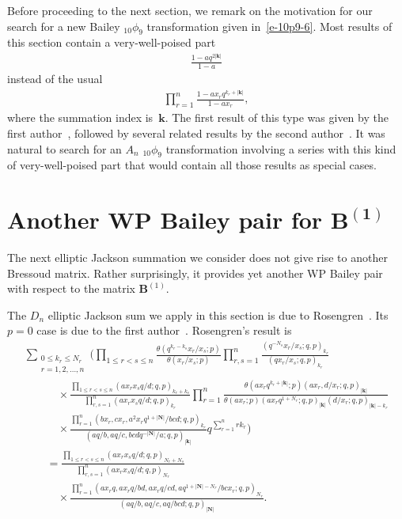 \documentclass[pdftex]{sigma}
\numberwithin{equation}{section}
\newcommand{\sumN}{{\left| \boldsymbol{N} \right|}}
\newcommand\sumk{{\left| \boldsymbol{k} \right|}}
\newcommand{\B}{{ \mathbf B}}
\renewcommand{\k}{{ \boldsymbol{k}}}
\newcommand{\multsum}[3]{{\sum\limits_{\substack{{0\le #1_#3 \le #2_#3} \\
{#3 =1,2,\dots, n}}}}}
\newcommand{\triprod}[1]{\prod\limits_{1\le r < s \le #1}}
\newcommand{\sqprod}[1]{\prod\limits_{r, s =1}^{#1}} %
\newcommand{\smallprod}[1]{\prod\limits_{r =1}^{#1}} %
\newcommand{\xover}[1]{#1_{r}/#1_{s}}
\newcommand{\ellipticqrfac}[2]{{\left({#1}; q, p\right)_{#2}}} %
\newcommand{\elliptictheta}[1]{\theta \left({#1} ; p\right) }
\newcommand{\ellipticvandermonde}[3]{\triprod{#3} %
\!\! \frac{\elliptictheta{q^{#2_r-#2_s} \xover {#1} }}{\elliptictheta{\xover{#1}}}
}
\begin{document}
Before proceeding to the next section, we remark on the motivation for our search for a new Bailey $_{10}\phi_9$ transformation given in~\eqref{e-10p9-6}. Most results of this section contain a very-well-poised part
\begin{gather*}\frac{1-aq^{2\sumk}}{1-a}\end{gather*}
instead of the usual
\begin{gather*}\smallprod n\frac{1-ax_rq^{k_r+\sumk}}{1-ax_r},\end{gather*}
where the summation index is~$\k$. The first result of this type was given by the first author~\cite{GB1995}, followed by several related results by the second author~\cite{MS2008}. It was natural to search for an $A_n$ $_{10}\phi_9$ transformation involving a series with this kind of very-well-poised part that would contain all those results as special cases.

\section[Another WP Bailey pair for $\B^{(1)}$]{Another WP Bailey pair for $\boldsymbol{\B^{(1)}}$}\label{sec:dougall4}

The next elliptic Jackson summation we consider does not give rise to another Bressoud matrix. Rather surprisingly, it provides yet another WP Bailey pair with respect to the matrix $\B^{(1)}$.

The $D_n$ elliptic Jackson sum we apply in this section is due to Rosengren~\cite[Corollary~6.4]{HR2004}. Its $p=0$ case is due to the first author~\cite{GB1999a}. Rosengren's result is
\begin{gather}
\multsum{k}{N}{r} \Bigg(\ellipticvandermonde{x}{k}{n}
\sqprod n \frac{\ellipticqrfac{q^{-N_s}\xover{x}}{k_r} }{\ellipticqrfac{q\xover{x}}{k_r} }\nonumber\\
\qquad\quad{}\times
\frac{\triprod n \ellipticqrfac{ax_rx_sq/d}{k_r+k_s}}
{\sqprod n \ellipticqrfac{ax_rx_sq/d}{k_r}}
 \smallprod n
\frac{\elliptictheta{ax_rq^{k_r+\sumk}} \ellipticqrfac{ax_r,d/x_r}{\sumk}}
{\elliptictheta{ax_r}\ellipticqrfac{ax_rq^{1+N_r}}{\sumk}\ellipticqrfac{d/x_r}{\sumk-k_r}}\nonumber\\
\qquad\quad{}\times
\frac{\smallprod n{\ellipticqrfac{bx_r, cx_r, a^2x_rq^{1+\sumN}/bcd}{k_r}}
}{\ellipticqrfac{aq/b,aq/c,bcdq^{-\sumN}/a}{\sumk} }
q^{\sum\limits_{r=1}^n rk_r}\Bigg)\nonumber\\
\qquad{} =
 \frac{\triprod n \ellipticqrfac{ax_rx_sq/d}{N_r+N_s}}{\sqprod n \ellipticqrfac{ax_rx_sq/d}{N_r}} \nonumber\\
\qquad\quad{}\times \frac{\smallprod n {\ellipticqrfac{ax_rq, ax_rq/bd, ax_rq/cd, aq^{1+\sumN-N_r}/bcx_r}{N_r}}}
{\ellipticqrfac{aq/b, aq/c, aq/bcd}{\sumN}}.\label{e-8p7-4}
\end{gather}
\end{document}
